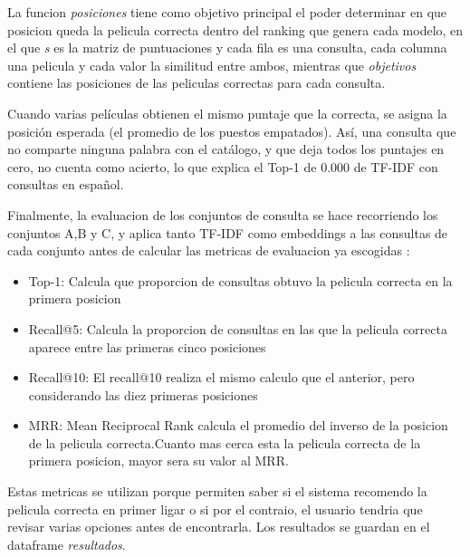 La funcion \textit{posiciones} tiene como objetivo principal el poder determinar en que posicion queda la pelicula correcta dentro del ranking que genera cada modelo, en el que \textit{s} es la matriz de puntuaciones y cada fila es una consulta, cada columna una pelicula y cada valor la similitud entre ambos, mientras que \textit{objetivos} contiene las posiciones de las peliculas correctas para cada consulta.

Cuando varias películas obtienen el mismo puntaje que la correcta, se asigna la posición esperada (el promedio de los puestos empatados). Así, una consulta que no comparte ninguna palabra con el catálogo, y que deja todos los puntajes en cero, no cuenta como acierto, lo que explica el Top-1 de 0.000 de TF-IDF con consultas en español.

Finalmente, la evaluacion de los conjuntos de consulta se hace recorriendo los conjuntos A,B y C, y aplica tanto TF-IDF como embeddings a las consultas de cada conjunto antes de calcular las metricas de evaluacion ya escogidas \cite{manning2008ir}:

\begin{itemize}
    \item Top-1: Calcula que proporcion de consultas obtuvo la pelicula correcta en la primera posicion
    \item Recall@5: Calcula la proporcion de consultas en las que la pelicula correcta aparece entre las primeras cinco posiciones
    \item Recall@10: El recall@10 realiza el mismo calculo que el anterior, pero considerando las diez primeras posiciones
    \item MRR: Mean Reciprocal Rank calcula el promedio del inverso de la posicion de la pelicula correcta.Cuanto mas cerca esta la pelicula correcta de la primera posicion, mayor sera su valor al MRR.
\end{itemize}

Estas metricas se utilizan porque permiten saber si el sistema recomendo la pelicula correcta en primer ligar o si por el contraio, el usuario tendria que revisar varias opciones antes de encontrarla. Los resultados se guardan en el dataframe \textit{resultados}.

